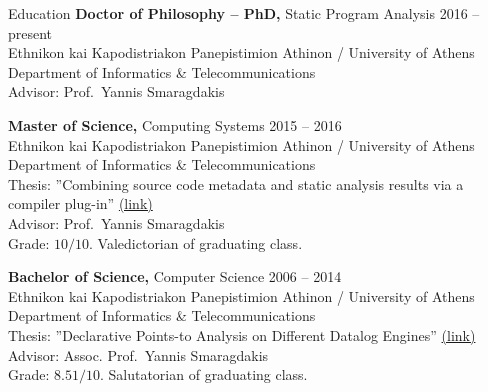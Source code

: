 \documentclass{resume}
\begin{document}
\newcommand{\mytilde}{\raise.17ex\hbox{$\scriptstyle\mathtt{\sim}$}}
\newcommand{\indentitem}{\setlength\itemindent{25pt}}


\begin{rSection}{Education}
  {\bf Doctor of Philosophy -- PhD,} Static Program Analysis \hfill {2016 -- present } \\
  Ethnikon kai Kapodistriakon Panepistimion Athinon / University of Athens \\
  Department of Informatics \& Telecommunications \\
  Advisor: Prof.~Yannis Smaragdakis

  {\bf Master of Science,} Computing Systems \hfill {2015 -- 2016 } \\
  Ethnikon kai Kapodistriakon Panepistimion Athinon / University of Athens \\
  Department of Informatics \& Telecommunications \\
  Thesis: ''Combining source code metadata and static analysis results via a compiler plug-in'' \href{http://cgi.di.uoa.gr/~smaragd/theses/antoniadis2.pdf}{ (link)} \\
  Advisor: Prof.~Yannis Smaragdakis \\
  Grade: $10 / 10$. Valedictorian of graduating class.

  {\bf Bachelor of Science,}  Computer Science \hfill {2006 -- 2014}  \\
  Ethnikon kai Kapodistriakon Panepistimion Athinon / University of Athens \\
  Department of Informatics \& Telecommunications \\
  Thesis: ''Declarative Points-to Analysis on Different Datalog Engines'' \href{http://cgi.di.uoa.gr/~smaragd/theses/antoniadis.pdf}{ (link)} \\
  Advisor: Assoc. Prof.~Yannis Smaragdakis \\
  Grade: $8.51 / 10$. Salutatorian of graduating class.

\end{rSection}

\end{document}
